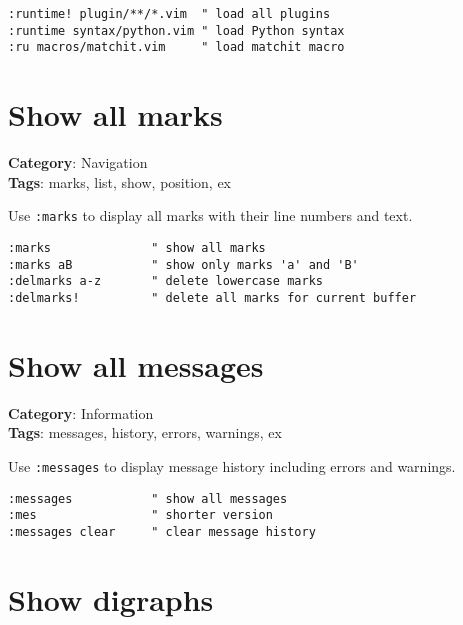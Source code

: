 {{{{{\begin{Exa*}{}
\begin{Verbatim}[fontsize=\footnotesize, breaklines, breakanywhere]
:runtime! plugin/**/*.vim  " load all plugins
:runtime syntax/python.vim " load Python syntax
:ru macros/matchit.vim     " load matchit macro
\end{Verbatim}
\end{Exa*}

\section{Show all marks}

\textbf{Category}: Navigation\\ \textbf{Tags}: marks, list, show, position, ex
\vspace{0.5cm}

Use {\footnotesize \Verb§:marks§} to display all marks with their line numbers and text.

\begin{Exa*}{}
\begin{Verbatim}[fontsize=\footnotesize, breaklines, breakanywhere]
:marks              " show all marks
:marks aB           " show only marks 'a' and 'B'
:delmarks a-z       " delete lowercase marks
:delmarks!          " delete all marks for current buffer
\end{Verbatim}
\end{Exa*}

\section{Show all messages}

\textbf{Category}: Information\\ \textbf{Tags}: messages, history, errors, warnings, ex
\vspace{0.5cm}

Use {\footnotesize \Verb§:messages§} to display message history including errors and warnings.

\begin{Exa*}{}
\begin{Verbatim}[fontsize=\footnotesize, breaklines, breakanywhere]
:messages           " show all messages
:mes                " shorter version
:messages clear     " clear message history
\end{Verbatim}
\end{Exa*}

\section{Show digraphs}

}}}}}
